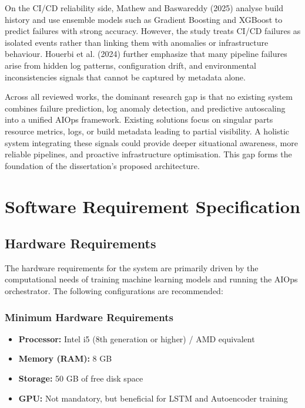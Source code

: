 \documentclass[12pt]{report}
\begin{document}
On the CI/CD reliability side, Mathew and Baswareddy (2025) analyse build history and use ensemble models such as Gradient Boosting and XGBoost to predict failures with strong accuracy. However, the study treats CI/CD failures as isolated events rather than linking them with anomalies or infrastructure behaviour. Houerbi et al. (2024) further emphasize that many pipeline failures arise from hidden log patterns, configuration drift, and environmental inconsistencies signals that cannot be captured by metadata alone.

Across all reviewed works, the dominant research gap is that no existing system combines failure prediction, log anomaly detection, and predictive autoscaling into a unified AIOps framework. Existing solutions focus on singular parts resource metrics, logs, or build metadata leading to partial visibility. A holistic system integrating these signals could provide deeper situational awareness, more reliable pipelines, and proactive infrastructure optimisation. This gap forms the foundation of the dissertation’s proposed architecture.

\clearpage
\chapter{Software Requirement Specification}

\section{Hardware Requirements}

The hardware requirements for the system are primarily driven by the computational needs of training machine learning models and running the AIOps orchestrator. The following configurations are recommended:

\subsection*{Minimum Hardware Requirements}
\begin{itemize}
    \item \textbf{Processor:} Intel i5 (8th generation or higher) / AMD equivalent
    \item \textbf{Memory (RAM):} 8 GB
    \item \textbf{Storage:} 50 GB of free disk space
    \item \textbf{GPU:} Not mandatory, but beneficial for LSTM and Autoencoder training
\end{itemize}
\end{document}
